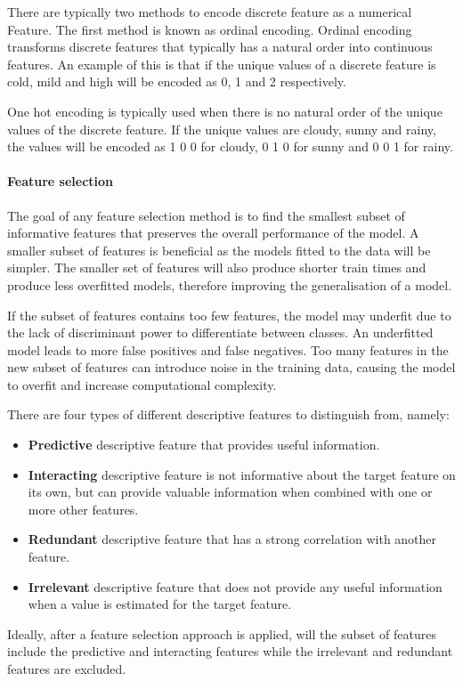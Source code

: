 \documentclass[10pt, conference]{IEEEtran}
\begin{document}
There are typically two methods to encode discrete feature as a numerical Feature. The first method is known as
ordinal encoding. Ordinal encoding transforms discrete features that typically has a natural order into continuous
features. An example of this is that if the unique values of a discrete feature is cold, mild and high will be
encoded as 0, 1 and 2 respectively.

One hot encoding is typically used when there is no natural order of the unique values of the discrete feature.
If the unique values are cloudy, sunny and rainy, the values will be encoded as 1 0 0 for cloudy, 0 1 0 for
sunny and 0 0 1 for rainy.


\paragraph{Feature selection} \label{feature_selection background}

The goal of any feature selection method is to find the smallest subset of informative features that
preserves the overall performance of the model. A smaller subset of features is beneficial as the
models fitted to the data will be simpler. The smaller set of features will also produce shorter
train times and produce less overfitted models, therefore improving the generalisation of a model.

If the subset of features contains too few features, the model may underfit due to the lack of
discriminant power to differentiate between classes. An underfitted model leads to more false
positives and false negatives. Too many features in the new subset of features can introduce
noise in the training data, causing the model to overfit and increase computational complexity.

There are four types of different descriptive features to distinguish from, namely:
\begin{itemize}
    \item \textbf{Predictive} descriptive feature that provides useful information.
    \item \textbf{Interacting} descriptive feature is not informative about the target feature on its own,
          but can provide valuable information when combined with one or more other features.
    \item \textbf{Redundant} descriptive feature that has a strong correlation with another feature.
    \item \textbf{Irrelevant} descriptive feature that does not provide any useful information when a value
           is estimated for the target feature.
\end{itemize}
Ideally, after a feature selection approach is applied, will the subset of features include the predictive and
interacting features while the irrelevant and redundant features are excluded.
\end{document}
